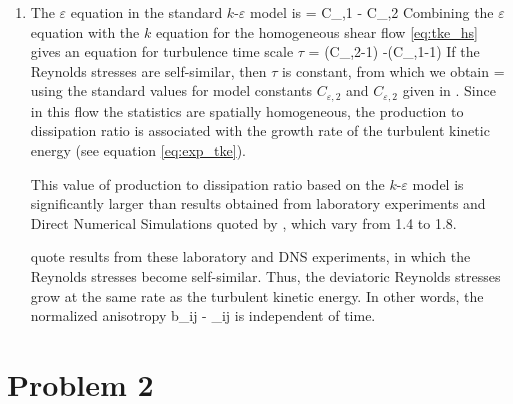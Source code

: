 \documentclass[11pt]{article}
\begin{document}
\begin{enumerate}[label=(\alph*)]
        \item The $\varepsilon$ equation in the standard $k$-$\varepsilon$ model is
            \beq
             = C_{\varepsilon,1}
                - C_{\varepsilon,2} \per
            \eeq
            Combining the $\varepsilon$ equation with the $k$ equation for the homogeneous shear
            flow \eqref{eq:tke_hs} gives an equation for turbulence time scale $\tau$
            \beq
                 = (C_{\varepsilon,2}-1) -(C_{\varepsilon,1}-1)\per
            \eeq
           If the Reynolds stresses are self-similar, then $\tau$ is constant, from which we obtain           \beq
             =  \com
           \eeq
            using the standard values for model constants $C_{\varepsilon,2}$ and 
            $C_{\varepsilon,2}$ given in \cite{pope2000}. Since in this flow
            the  statistics are spatially homogeneous, the production to dissipation ratio
            is associated with the growth rate of the turbulent kinetic energy (see equation \ref{eq:exp_tke}).
    
            This value of production to dissipation ratio based on the $k$-$\varepsilon$ model is 
            significantly larger than results obtained from laboratory experiments and Direct Numerical
            Simulations quoted by \cite{pope2000}, which vary from 1.4 to 1.8.

            \cite{pope2000} quote results from these laboratory and DNS experiments, in which
            the Reynolds stresses become self-similar. Thus, the deviatoric Reynolds stresses grow
            at the same rate as the turbulent kinetic energy. In other words, the normalized anisotropy
            \beq
            b_{ij}  {} - \delta_{ij}
            \eeq
            is independent of time.

\end{enumerate}


\section*{Problem 2}
\end{document}
